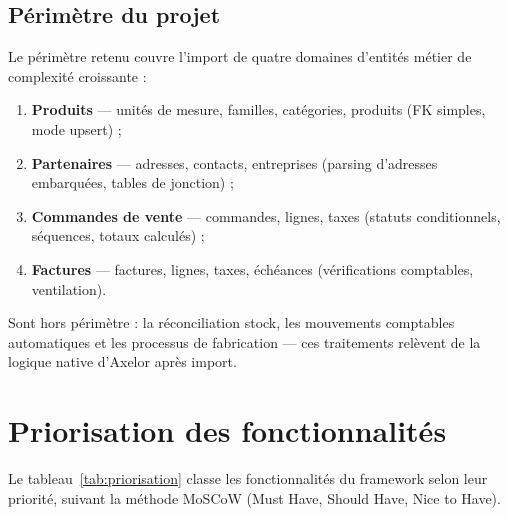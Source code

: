 \subsection{Périmètre du projet}

Le périmètre retenu couvre l'import de quatre domaines d'entités métier de complexité croissante :
\begin{enumerate}
    \item \textbf{Produits} — unités de mesure, familles, catégories, produits (FK simples, mode upsert) ;
    \item \textbf{Partenaires} — adresses, contacts, entreprises (parsing d'adresses embarquées, tables de jonction) ;
    \item \textbf{Commandes de vente} — commandes, lignes, taxes (statuts conditionnels, séquences, totaux calculés) ;
    \item \textbf{Factures} — factures, lignes, taxes, échéances (vérifications comptables, ventilation).
\end{enumerate}

Sont hors périmètre : la réconciliation stock, les mouvements comptables automatiques et les processus de fabrication — ces traitements relèvent de la logique native d'Axelor après import.

\section{Priorisation des fonctionnalités}

Le tableau~\ref{tab:priorisation} classe les fonctionnalités du framework selon leur priorité, suivant la méthode MoSCoW (Must Have, Should Have, Nice to Have).

